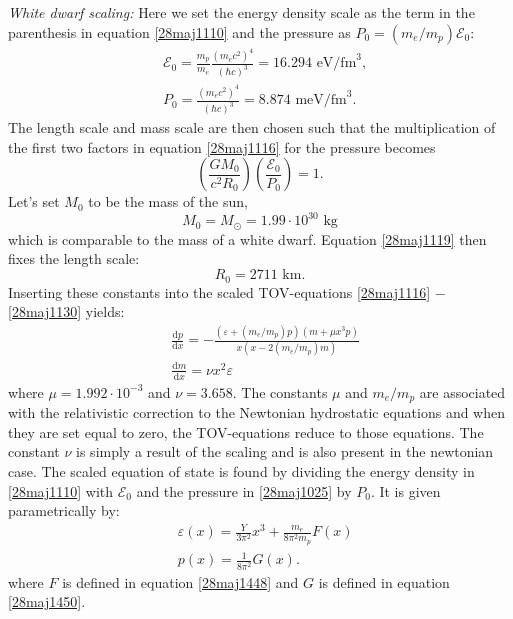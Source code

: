\documentclass[twocolumn]{article}
\begin{document}
\begin{large}
\textit{White dwarf scaling:} Here we set the energy density scale as the term in the parenthesis in equation \eqref{28maj1110} and the pressure as $P_0 = (m_e/m_p)\mathcal{E}_0$:
\begin{equation}
\begin{split}
    &\mathcal{E}_0 = \frac{m_p}{m_e}\frac{(m_ec^2)^4}{(\hbar c)^3} = 16.294\text{ eV/fm}^3 , \\ 
    &P_0 = \frac{(m_ec^2)^4}{(\hbar c)^3} = 8.874\text{ meV/fm}^3.
    \end{split}
\end{equation}
The length scale and mass scale are then chosen such that the multiplication of the first two factors in equation \eqref{28maj1116} for the pressure becomes
\begin{equation}
    \label{28maj1119}
    \left(\frac{GM_0}{c^2R_0}\right)\left(\frac{\mathcal{E}_0}{P_0}\right) = 1.
\end{equation}
Let's set $M_0$ to be the mass of the sun, 
\begin{equation}
    M_0 = M_\odot = 1.99\cdot 10^{30} \text{ kg}
\end{equation}
which is comparable to the mass of a white dwarf. Equation \eqref{28maj1119} then fixes the length scale:
\begin{equation}
    R_0 = 2711 \text{ km}.
\end{equation}
Inserting these constants into the scaled TOV-equations \eqref{28maj1116} $-$ \eqref{28maj1130} yields:
\begin{equation}
    \label{28maj1427}
    \begin{split}
        &\frac{\text{d}p}{\text{d}x} = -\frac{(\varepsilon + (m_e/m_p)p)(m+\mu x^3p)}{x(x-2(m_e/m_p)m)} \\ 
        &\frac{\text{d}m}{\text{d}x} = \nu x^2\varepsilon
    \end{split}
\end{equation}
where $\mu = 1.992\cdot 10^{-3}$ and $\nu = 3.658$. The constants $\mu$ and $m_e/m_p$ are associated with the relativistic correction to the Newtonian hydrostatic equations and when they are set equal to zero, the TOV-equations reduce to those equations. The constant $\nu$ is simply a result of the scaling and is also present in the newtonian case. The scaled equation of state is found by dividing the energy density in \eqref{28maj1110} with $\mathcal{E}_0$ and the pressure in \eqref{28maj1025} by $P_0$. It is given parametrically by:
\begin{equation}
    \begin{split}
        &\varepsilon(x) = \frac{Y}{3\pi^2}x^3 + \frac{m_e}{8\pi^2 m_p}F(x) \\ 
        &p(x) = \frac{1}{8\pi^2}G(x).
    \end{split}
\end{equation}
where $F$ is defined in equation \eqref{28maj1448} and $G$ is defined in equation \eqref{28maj1450}.


\end{large}
\end{document}
